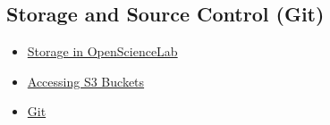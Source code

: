\subsection{Storage and Source Control (Git)}

\begin{itemize}
\item \href{/opensciencelab-storage}{Storage in OpenScienceLab}
\item \href{/s3-buckets}{Accessing S3 Buckets}
\item \href{/git-in-opensarlab}{Git}
\end{itemize}